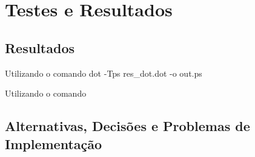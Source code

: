 \section{Testes e Resultados}
\label{sec:ts:c}


\subsection{Resultados}

Utilizando o comando 
dot -Tps res_dot.dot -o out.ps


Utilizando o comando 

\subsection{Alternativas, Decisões e Problemas de Implementação}



